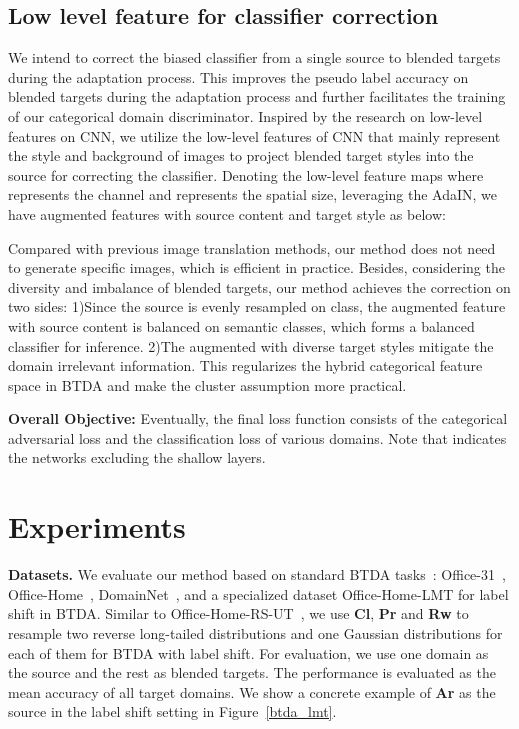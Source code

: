 \documentclass[letterpaper]{article} \usepackage{aaai23}  \usepackage{times}  \usepackage{helvet}  \usepackage{courier}  \usepackage[hyphens]{url}  \usepackage{graphicx} \urlstyle{rm} \def\UrlFont{\rm}  \usepackage{natbib}  \usepackage{caption} \frenchspacing  \setlength{\pdfpagewidth}{8.5in}  \setlength{\pdfpageheight}{11in}
\begin{document}
\subsection{Low level feature for classifier correction}
We intend to correct the biased classifier  from a single source to blended targets during the adaptation process. This improves the pseudo label accuracy on blended targets during the adaptation process and further facilitates the training of our categorical domain discriminator. Inspired by the research on low-level features on CNN, we utilize the low-level features of CNN that mainly represent the style and background of images to project blended target styles into the source for correcting the classifier. Denoting the low-level feature maps  where  represents the channel and  represents the spatial size, leveraging the AdaIN, we have augmented features  with source content and target style as below:
\begin{small}



\end{small}
Compared with previous image translation methods, our method does not need to generate specific images, which is efficient in practice. Besides, considering the diversity and imbalance of blended targets, our method achieves the correction on two sides: 1)Since the source is evenly resampled on class, the augmented feature  with source content is balanced on semantic classes, which forms a balanced classifier for inference. 2)The augmented  with diverse target styles mitigate the domain irrelevant information. This regularizes the hybrid categorical feature space in BTDA and make the cluster assumption more practical.

\noindent\textbf{Overall Objective:} Eventually, the final loss function consists of the categorical adversarial loss and the classification loss of various domains. Note that  indicates the networks excluding the shallow layers.
\begin{small}


\end{small}




\section{Experiments}
\noindent\textbf{Datasets.} We evaluate our method based on standard BTDA tasks~\cite{chen2019blending,roy2021curriculum}: Office-31~\cite{office31}, Office-Home~\cite{officehome}, DomainNet~\cite{domainnet}, and a specialized dataset Office-Home-LMT for label shift in BTDA. Similar to Office-Home-RS-UT~\cite{jiang2020implicit}, we use \textbf{Cl}, \textbf{Pr} and \textbf{Rw} to resample two reverse long-tailed distributions and one Gaussian distributions for each of them for BTDA with label shift. For evaluation, we use one domain as the source and the rest as blended targets. The performance is evaluated as the mean accuracy of all target domains. We show a concrete example of \textbf{Ar} as the source in the label shift setting in Figure~\ref{btda_lmt}.
\end{document}
